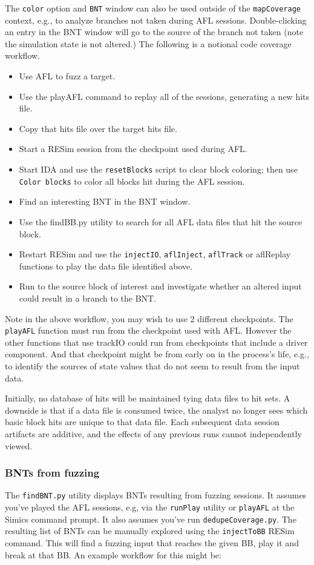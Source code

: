 \documentclass[titlepage]{article}
\begin{document}
The {\tt color} option and {\tt BNT} window can also be used outside of the {\tt mapCoverage} context, e.g., to analyze branches not 
taken during AFL sessions.  Double-clicking an entry in the BNT window will go to the source of the branch not taken (note the simulation state
is not altered.)  The following is a notional code coverage workflow.
\begin{itemize}
\item Use AFL to fuzz a target.
\item Use the playAFL command to replay all of the sessions, generating a new hits file.
\item Copy that hits file over the target hits file.
\item Start a RESim session from the checkpoint used during AFL.
\item Start IDA and use the {\tt resetBlocks} script to clear block coloring; then use {\tt Color blocks} to color all blocks hit
during the AFL session.
\item Find an interesting BNT in the BNT window.
\item Use the findBB.py utility to search for all AFL data files that hit the source block.
\item Restart RESim and use the {\tt injectIO}, {\tt aflInject}, {\tt aflTrack} or {aflReplay} functions to play the data file identified above.
\item Run to the source block of interest and investigate whether an altered input could result in a branch to the BNT.
\end{itemize}
Note in the above workflow, you may wish to use 2 different checkpoints.  The {\tt playAFL} function must run from the
checkpoint used with AFL.  However the other functions that use trackIO could run from checkpoints that include a driver component.  And 
that checkpoint might be from early on in the process's life, e.g., to identify the sources of state values that do not seem to result from
the input data.

Initially, no database of hits will be maintained tying data files to hit sets.  A downside is that if a data file is consumed twice, the analyst no longer sees
which basic block hits are unique to that data file. Each subsequent data session artifacts are additive, and the effects of any previous runs cannot independently viewed.

\subsubsection{BNTs from fuzzing}
\label{BNT-fuzz}
The {\tt findBNT.py} utility displays BNTs resulting from fuzzing sessions.  It assumes you've played the AFL sessions, e.g, via the {\tt runPlay} utility or {\tt playAFL}
at the Simics command prompt.  It also assumes you've run {\tt dedupeCoverage.py}.  The resulting list of BNTs can be manually explored using the {\tt injectToBB}
RESim command.  This will find a fuzzing input that reaches the given BB, play it and break at that BB.  An example workflow for this might be:
\end{document}
